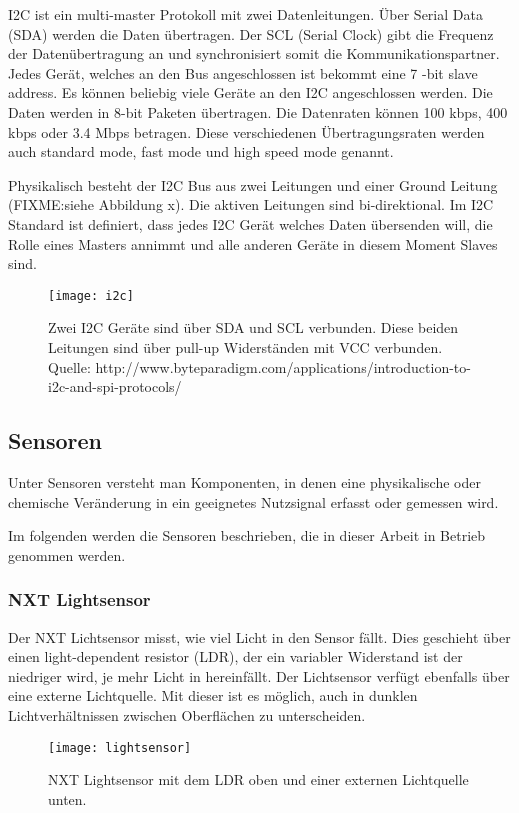 I2C ist ein multi-master Protokoll mit zwei Datenleitungen. Über Serial Data (SDA) werden die Daten übertragen. Der SCL (Serial Clock) gibt die Frequenz der Datenübertragung an und synchronisiert somit die Kommunikationspartner. Jedes Gerät, welches an den Bus angeschlossen ist bekommt eine 7 -bit slave address. Es können beliebig viele Geräte an den I2C angeschlossen werden. Die Daten werden in 8-bit Paketen übertragen. Die Datenraten können 100 kbps, 400 kbps oder 3.4 Mbps betragen. Diese verschiedenen Übertragungsraten werden auch standard mode, fast mode und high speed mode genannt.

Physikalisch besteht der I2C Bus aus zwei Leitungen und einer Ground Leitung (FIXME:siehe Abbildung x). Die aktiven Leitungen sind bi-direktional. Im I2C Standard ist definiert, dass jedes I2C Gerät welches Daten übersenden will, die Rolle eines Masters annimmt und alle anderen Geräte in diesem Moment Slaves sind.

\begin{figure}[h]
  \centering
  \texttt{[image: i2c]}
  \caption{Zwei I2C Geräte sind über SDA und SCL verbunden. Diese beiden Leitungen sind über pull-up Widerständen mit VCC verbunden. Quelle: http://www.byteparadigm.com/applications/introduction-to-i2c-and-spi-protocols/}
  \label{Kap1:I2C}
\end{figure}

\subsection{Sensoren}
Unter Sensoren versteht man Komponenten, in denen eine physikalische oder chemische Veränderung in ein geeignetes Nutzsignal erfasst oder gemessen wird. \cite{FIXME: }

Im folgenden werden die Sensoren beschrieben, die in dieser Arbeit in Betrieb genommen werden.

\subsubsection{NXT Lightsensor}
Der NXT Lichtsensor misst, wie viel Licht  in den Sensor fällt. Dies geschieht über einen light-dependent resistor (LDR), der ein variabler Widerstand ist der niedriger wird, je mehr Licht in hereinfällt. Der Lichtsensor verfügt ebenfalls über eine externe Lichtquelle. Mit dieser ist es möglich, auch in dunklen Lichtverhältnissen zwischen Oberflächen zu unterscheiden.

\begin{figure}[h]
  \centering
  \texttt{[image: lightsensor]}
  \caption{NXT Lightsensor mit dem LDR oben und einer externen Lichtquelle unten.}
  \label{Kap1:Lightsensor}
\end{figure}

